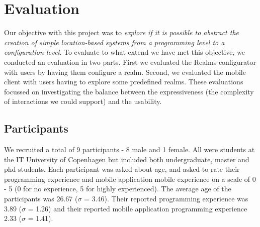 \section{Evaluation}
\label{sec.eval}
Our objective with this project was to \emph{explore if it is possible to abstract the creation of simple location-based systems from a programming level to a configuration level}. To evaluate to what extend we have met this objective, we conducted an evaluation in two parts. First we evaluated the Realms configurator with users by having them configure a realm. Second, we evaluated the mobile client with users having to explore some predefined realms. These evaluations focussed on investigating the balance between the expressiveness (the complexity of interactions we could support) and the usability.

\subsection{Participants} %
\label{sub:participants}
We recruited a total of 9 participants - 8 male and 1 female. All were students at the IT University of Copenhagen but included both undergraduate, master and phd students. Each participant was asked about age, and asked to rate their programming experience and mobile application mobile experience on a scale of 0 - 5 (0 for no experience, 5 for highly experienced). The average age of the participants was 26.67 ($\sigma$ = 3.46). Their reported programming experience was 3.89 ($\sigma$ = 1.26) and their reported mobile application programming experience 2.33 ($\sigma$ =  1.41). 

